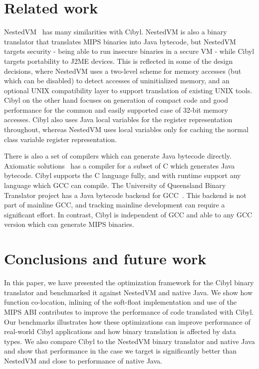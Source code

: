 \FloatBarrier
\section{Related work}
\label{sec:cp:related_work}
NestedVM~\cite{alliet04nestedvm} has many similarities with Cibyl. NestedVM is
also a binary translator that translates MIPS binaries into Java bytecode, but
NestedVM targets security - being able to run insecure binaries in a secure VM
- while Cibyl targets portability to J2ME devices. This is reflected in some
of the design decisions, where NestedVM uses a two-level scheme for memory
accesses (but which can be disabled) to detect accesses of uninitialized
memory, and an optional UNIX compatibility layer to support translation of
existing UNIX tools. Cibyl on the other hand focuses on generation of compact
code and good performance for the common and easily supported case of 32-bit
memory accesses. Cibyl also uses Java local variables for the register
representation throughout, whereas NestedVM uses local variables only for
caching the normal class variable register representation.

There is also a set of compilers which can generate Java bytecode directly.
Axiomatic solutions~\cite{axiomsol} has a compiler for a subset of C which
generates Java bytecode. Cibyl supports the C language fully, and with runtime
support any language which GCC can compile. The University of Queensland
Binary Translator project has a Java bytecode backend for
GCC~\cite{cifuentes00UAB}. This backend is not part of mainline GCC, and
tracking mainline development can require a significant effort. In contrast,
Cibyl is independent of GCC and able to any GCC version which can generate
MIPS binaries.

\section{Conclusions and future work}
\label{sec:cp:conclusions}
In this paper, we have presented the optimization framework for the Cibyl
binary translator and benchmarked it against NestedVM and native Java. We show
how function co-location, inlining of the soft-float implementation and use of
the MIPS ABI contributes to improve the performance of code translated with
Cibyl. Our benchmarks illustrates how these optimizations can improve
performance of real-world Cibyl applications and how binary translation is
affected by data types. We also compare Cibyl to the NestedVM binary
translator and native Java and show that performance in the case we target is
significantly better than NestedVM and close to performance of native Java.

